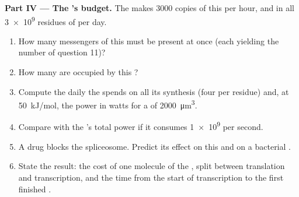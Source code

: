\begin{problem}
\medskip
\noindent\textbf{Part IV --- The 's budget.}
The  makes \num{3000} copies of this  per hour, and in
all \num{3e9} residues of  per day.
\begin{enumerate}[resume]
  \item How many messengers of this  must be present at once
        (each yielding the number of question 11)?
  \item How many  are occupied by this ?
  \item Compute the daily  the  spends on all its 
        synthesis (four per residue) and, at \qty{50}{kJ/mol}, the
        power in watts for a  of \qty{2000}{\micro m^3}.
  \item Compare with the 's total power if it consumes
        \qty{1e9}{}  per second.
  \item A drug blocks the spliceosome. Predict its effect on this
         and on a bacterial .
  \item State the result: the  cost of one molecule of the
        , split between translation and transcription, and the
        time from the start of transcription to the first finished
        .
\end{enumerate}
\end{problem}
